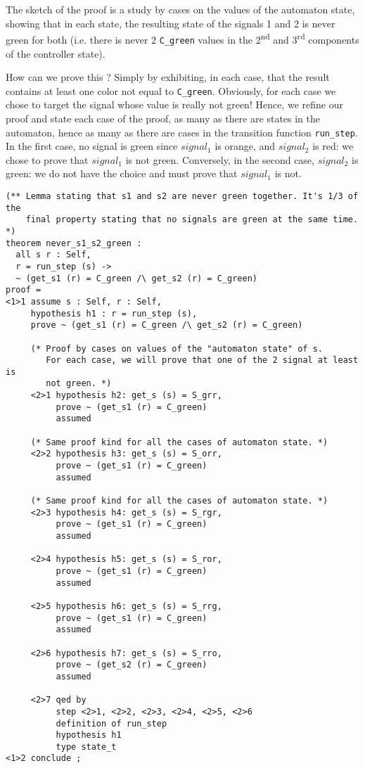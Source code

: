 The sketch of the proof is a study by cases on the values of the
automaton state, showing that in each state, the resulting state of
the signals 1 and 2 is never green for both (i.e. there is never 2
\lstinline"C_green" values in the 2\textsuperscript{nd} and
3\textsuperscript{rd} components of the controller state). 

How can we prove this ? Simply by exhibiting, in each case, that the result
contains at least one color not equal to
\lstinline"C_green". Obviously, for each case we chose to target the
signal whose value is really not green! Hence, we refine our proof and
state each case of the proof, as many as there are states in the
automaton, hence as many as there are cases in the transition function
\lstinline"run_step". In the first case, no signal is green since
$signal_1$ is orange, and $signal_2$ is red: we chose to prove that 
$signal_1$ is not green. Conversely, in the second case, $signal_2$ is
green: we do not have the choice and must prove that $signal_1$ is not.

{\scriptsize
\begin{lstlisting}
(** Lemma stating that s1 and s2 are never green together. It's 1/3 of the
    final property stating that no signals are green at the same time. *)
theorem never_s1_s2_green :
  all s r : Self,
  r = run_step (s) ->
  ~ (get_s1 (r) = C_green /\ get_s2 (r) = C_green)
proof =
<1>1 assume s : Self, r : Self,
     hypothesis h1 : r = run_step (s),
     prove ~ (get_s1 (r) = C_green /\ get_s2 (r) = C_green)

     (* Proof by cases on values of the "automaton state" of s.
        For each case, we will prove that one of the 2 signal at least is
        not green. *)
     <2>1 hypothesis h2: get_s (s) = S_grr,
          prove ~ (get_s1 (r) = C_green)
          assumed

     (* Same proof kind for all the cases of automaton state. *)
     <2>2 hypothesis h3: get_s (s) = S_orr,
          prove ~ (get_s1 (r) = C_green)
          assumed

     (* Same proof kind for all the cases of automaton state. *)
     <2>3 hypothesis h4: get_s (s) = S_rgr,
          prove ~ (get_s1 (r) = C_green)
          assumed

     <2>4 hypothesis h5: get_s (s) = S_ror,
          prove ~ (get_s1 (r) = C_green)
          assumed

     <2>5 hypothesis h6: get_s (s) = S_rrg,
          prove ~ (get_s1 (r) = C_green)
          assumed

     <2>6 hypothesis h7: get_s (s) = S_rro,
          prove ~ (get_s2 (r) = C_green)
          assumed

     <2>7 qed by
          step <2>1, <2>2, <2>3, <2>4, <2>5, <2>6
          definition of run_step
          hypothesis h1
          type state_t
<1>2 conclude ;
\end{lstlisting}}


